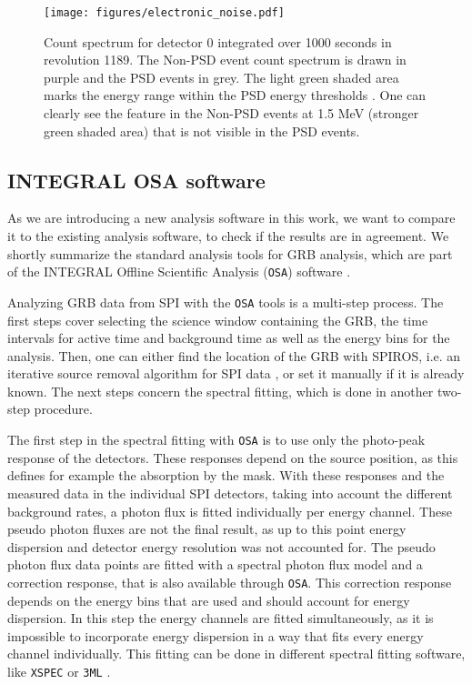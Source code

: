 \documentclass[twocolumn,traditabstract]{aa}
\begin{document}
\begin{figure}[ht]
    \begin{centering}
        \texttt{[image: figures/electronic\_noise.pdf]}
        \caption{Count spectrum for detector 0 integrated over 1000 seconds in revolution 1189. The Non-PSD event count spectrum is drawn in purple and the PSD events in grey. The light green shaded area marks the energy range within the PSD energy thresholds \citep{spi_electronic_noise}. One can clearly see the feature in the Non-PSD events at 1.5 MeV (stronger green shaded area) that is not visible in the PSD events.}
        \label{fig:electronic}
    \end{centering}
\end{figure}

\subsection{INTEGRAL OSA software}
\label{OSA}

As we are introducing a new analysis software in this work, we want to compare it to the existing analysis software, to check if the results are in agreement. We shortly summarize the standard analysis tools for GRB analysis, which are part of the INTEGRAL Offline Scientific Analysis ({\tt OSA}) software \citep{osa}.

Analyzing GRB data from SPI with the {\tt OSA} tools is a multi-step process. The first steps cover selecting the science window containing the GRB, the time intervals for active time and background time as well as the energy bins for the analysis. Then, one can either find the location of the GRB with SPIROS, i.e. an iterative source removal algorithm for SPI data \citep{Skinner-2003}, or set it manually if it is already known. The next steps concern the spectral fitting, which is done in another two-step procedure.

The first step in the spectral fitting with {\tt OSA} is to use only the photo-peak response of the detectors. These responses depend on the source position, as this defines for example the absorption by the mask. With these responses and the measured data in the individual SPI detectors, taking into account the different background rates, a photon flux is fitted individually per energy channel. These pseudo photon fluxes are not the final result, as up to this point energy dispersion and detector energy resolution was not accounted for.
The pseudo photon flux data points are fitted with a spectral photon flux model and a correction response, that is also available through {\tt OSA}. This correction response depends on the energy bins that are used and should account for energy dispersion. In this step the energy channels are fitted simultaneously, as it is impossible to incorporate energy dispersion in a way that fits every energy channel individually. This fitting can be done in different spectral fitting software, like {\tt XSPEC} \citep{xspec} or {\tt 3ML} \citep{3ML}.
\end{document}
